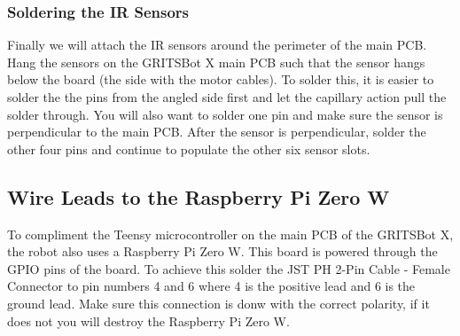 \subsubsection{Soldering the IR Sensors}
\label{sec:solderIRSensor}

Finally we will attach the IR sensors around the perimeter of the main PCB. Hang the sensors on the GRITSBot X main PCB such that the sensor hangs below the board (the side with the motor cables). To solder this, it is easier to solder the the pins from the angled side first and let the capillary action pull the solder through. You will also want to solder one pin and make sure the sensor is perpendicular to the main PCB. After the sensor is perpendicular, solder the other four pins and continue to populate the other six sensor slots.

\subsection{Wire Leads to the Raspberry Pi Zero W}
\label{sec:raspberryPiLeads}
To compliment the Teensy microcontroller on the main PCB of the GRITSBot X, the robot also uses a Raspberry Pi Zero W. This board is powered through the GPIO pins of the board. To achieve this solder the JST PH 2-Pin Cable - Female Connector to pin numbers 4 and 6 where 4 is the positive lead and 6 is the ground lead. Make sure this connection is donw with the correct polarity, if it does not you will destroy the Raspberry Pi Zero W.
